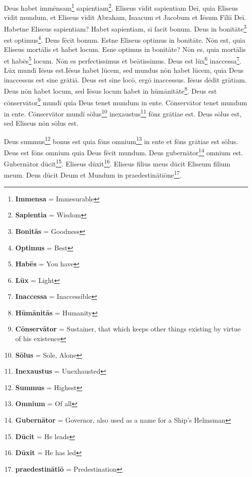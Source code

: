 Deus habet immēnsam\footnote{\textbf{Immensa} = Immesurable} sapientiam\footnote{\textbf{Sapientia} = Wisdom}. Eliseus vīdit sapientiam Deī, quia Eliseus vīdit mundum, et Eliseus vīdit Abraham, Isaacum et Jacobum et Iēsum Fīliī Deī. Habetne Eliseus sapientiam? Habet sapientiam, sī facit bonum. Deus in bonitāte\footnote{\textbf{Bonitās} = Goodness} est optimus\footnote{\textbf{Optimus} = Best}. Deus fēcit bonum.  Estne Eliseus optimus in bonitāte. Nōn est, quia Eliseus mortālis et habet locum. Esne optimus in bonitāte? Nōn es, quia mortālis et habēs\footnote{\textbf{Habēs} = You have} locum. Nōn es perfectissimus et beātissimus. Deus est lūx\footnote{\textbf{Lūx} = Light} inaccessa\footnote{\textbf{Inaccessa} = Inaccessible}. Lūx mundī Iēsus est.Iēsus habet lūcem, sed mundus nōn habet lūcem, quia Deus inaccessus est sine grātiā. Deus est sine locō, ergō inaccessus. Iēsus dēdit grātiam. Deus nōn habet locum, sed Iēsus locum habet in hūmānitāte\footnote{\textbf{Hūmānitās} = Humanity}. Deus est cōnservātor\footnote{\textbf{Cōnservātor} = Sustainer, that which keeps other things existing by virtue of his existence} mundī quia Deus tenet mundum in ente. Cōnservātor tenet mundum in ente. Cōnservātor mundī sōlus\footnote{\textbf{Sōlus} = Sole, Alone} inexaustus\footnote{\textbf{Inexaustus} = Unexhausted} fōns grātiae est. Deus sōlus est, sed Eliseus nōn sōlus est. 
\par
Deus summus\footnote{\textbf{Summus} = Highest} bonus est quia fōns omnium\footnote{\textbf{Omnium} = Of all} in ente et fōns grātiae est sōlus. Deus est fōns omnium quia Deus fēcit mundum. Deus gubernātor\footnote{\textbf{Gubernātor} = Governor, also used as a name for a Ship's Helmsman} omnium est. Gubernātor dūcit\footnote{\textbf{Dūcit} = He leads}. Eliseus dūxit\footnote{\textbf{Dūxit} = He has led}. Eliseus filius meus dūcit Eliseum filium meum. Deus dūcit Deum et Mundum in praedestinātiōne\footnote{\textbf{praedestinātiō} = Predestination}.  